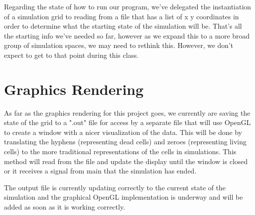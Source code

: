 \documentclass[12pt]{article}
\begin{document}
\par
Regarding the state of how to run our program, we've delegated the instantiation of a simulation grid to reading from a file that has a list of x y coordinates in order to determine what the starting state of the simulation will be. That's all the starting info we've needed so far, however as we expand this to a more broad group of simulation spaces, we may need to rethink this. However, we don't expect to get to that point during this class.

\section{Graphics Rendering}
\par 
As far as the graphics rendering for this project goes, we currently are saving the state of the grid to a ".out" file for access by a separate file that will use OpenGL to create a window with a nicer visualization of the data. This will be done by translating the hyphens (representing dead cells) and zeroes (representing living cells) to the more traditional representations of the cells in simulations. This method will read from the file and update the display until the window is closed or it receives a signal from main that the simulation has ended. 

\par
The output file is currently updating correctly to the current state of the simulation and the graphical OpenGL implementation is underway and will be added as soon as it is working correctly.
\end{document}
